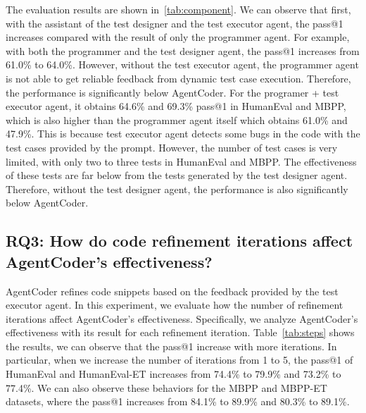 \documentclass{article}
\newcommand{\xxx}{AgentCoder\xspace}
\begin{document}
The evaluation results are shown in~\cref{tab:component}. We can observe that first, with the assistant of the test designer and the test executor agent, the pass@1 increases compared with the result of only the programmer agent. For example, with both the programmer and the test designer agent, the pass@1 increases from 61.0\% to 64.0\%. However, without the test executor agent, the programmer agent is not able to get reliable feedback from dynamic test case execution. Therefore, the performance is significantly below \xxx. 
For the programer + test executor agent, it obtains 64.6\% and 69.3\% pass@1 in HumanEval and MBPP, which is also higher than the programmer agent itself which obtains 61.0\% and 47.9\%. This is because test executor agent detects some bugs in the code with the test cases provided by the prompt.
However, the number of test cases is very limited, with only two to three tests in HumanEval and MBPP.
The effectiveness of these tests are far below from the tests generated by the test designer agent.
Therefore, without the test designer agent, the performance is also significantly below \xxx.



\subsection{RQ3: How do code refinement iterations affect \xxx's effectiveness?}
\label{sec:rq3results}
\xxx refines code snippets based on the feedback provided by the test executor agent. In this experiment, we evaluate how the number of refinement iterations affect \xxx's effectiveness. Specifically, we analyze \xxx's effectiveness with its result for each refinement iteration. Table~\ref{tab:steps} shows the results, we can observe that the pass@1 increase with more iterations. In particular, when we increase the number of iterations from 1 to 5, the pass@1 of HumanEval and HumanEval-ET increases from 74.4\% to 79.9\% and 73.2\% to 77.4\%. We can also observe these behaviors for the MBPP and MBPP-ET datasets, where the pass@1 increases from 84.1\% to 89.9\% and 80.3\% to 89.1\%. 
\end{document}
